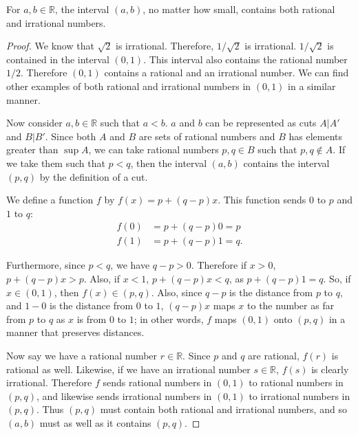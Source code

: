 \documentclass[12pt]{article}
\begin{document}
\begin{thm}
  For $a,b \in \mathbb{R}$, the interval $(a,b)$, no matter how small, contains both
  rational and irrational numbers.

  \begin{proof}
    We know that $\sqrt{2}$ is irrational. Therefore, $1/\sqrt{2}$ is irrational.
    $1/\sqrt{2}$ is contained in the interval $(0,1)$. This interval also contains
    the rational number $1/2$. Therefore $(0,1)$ contains a rational and an
    irrational number. We can find other examples of both rational and irrational
    numbers in $(0,1)$ in a similar manner.

    Now consider $a,b \in \mathbb{R}$ such that $a < b$. $a$ and $b$ can be
    represented as cuts $A|A'$ and $B|B'$. Since both $A$ and $B$ are sets of
    rational numbers and $B$ has elements greater than $\sup A$, we can take rational
    numbers $p,q \in B$ such that $p,q \notin A$. If we take them such that $p < q$,
    then the interval $(a,b)$ contains the interval $(p,q)$ by the definition of a cut.

    We define a function $f$ by $f(x) = p + (q - p)x$. This function sends $0$ to $p$
    and $1$ to $q$:
    \begin{align*}
      f(0) &= p + (q - p)0 = p\\
      f(1) &= p + (q - p)1 = q.
    \end{align*}

    Furthermore, since $p < q$, we have $q - p > 0$. Therefore if $x > 0$, $p + (q -
    p)x > p$. Also, if $x < 1$, $p + (q - p)x < q$, as $p + (q - p)1 = q$. So, if $x
    \in (0,1)$, then $f(x) \in (p,q)$. Also, since $q - p$ is the distance from $p$
    to $q$, and $1 - 0$ is the distance from $0$ to $1$, $(q - p)x$ maps $x$ to the
    number as far from $p$ to $q$ as $x$ is from $0$ to $1$; in other words, $f$ maps
    $(0,1)$ onto $(p,q)$ in a manner that preserves distances.

    Now say we have a rational number $r \in \mathbb{R}$. Since $p$ and $q$ are
    rational, $f(r)$ is rational as well. Likewise, if we have an irrational number
    $s \in \mathbb{R}$, $f(s)$ is clearly irrational. Therefore $f$ sends rational
    numbers in $(0,1)$ to rational numbers in $(p,q)$, and likewise sends irrational
    numbers in $(0,1)$ to irrational numbers in $(p,q)$. Thus $(p,q)$ must contain
    both rational and irrational numbers, and so $(a,b)$ must as well as it contains
    $(p,q)$.
  \end{proof}
\end{thm}
\end{document}
